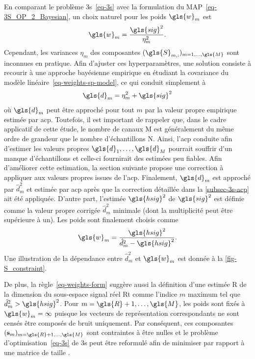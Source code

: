 En comparant le problème \gls{3s}~\eqref{eq-3s} avec la formulation du MAP~\eqref{eq-3S_OP_2_Bayesian}, un choix naturel pour les poids $\gls{w}_m$ est
\begin{equation}
    \gls{w}_m = \frac{\gls{sig}^2}{\eta_m^2}. 
\end{equation}
Cependant, les variances $\eta_m$ des composantes $(\gls{S}_{m, :})_{m=1,\dots,\gls{M}}$ sont inconnues en pratique. Afin d'ajuster ces hyperparamètres, une solution consiste à recourir à une approche bayésienne empirique en étudiant la covariance du modèle linéaire~\eqref{eq-weights-sp-model}, ce qui conduit simplement à
\begin{equation}
    \gls{d}_m = \eta_m^2 + \gls{sig}^2
\end{equation}
où $\gls{d}_m$ peut être approché pour tout $m$ par la valeur propre empirique estimée par \gls{acp}. Toutefois, il est important de rappeler que, dans le cadre applicatif de cette étude, le nombre de canaux \gls{M} est généralement du même ordre de grandeur que le nombre d'échantillons \gls{N}. Ainsi, l'\gls{acp} conduite afin d'estimer les valeurs propres $\gls{d}_1, \dots, \gls{d}_M$ pourrait souffrir d'un manque d'échantillons et celle-ci fournirait des estimées  peu fiables. Afin d'améliorer cette estimation, la section suivante propose une correction à appliquer aux valeurs propres issues de l'\gls{acp}. Finalement, $\gls{d}_m$ est approché par $\hat{d}_m^2$ et estimée par \gls{acp} après que la correction détaillée dans la \cref{subsec-3s-acp} ait été appliquée. D'autre part, l'estimée $\gls{hsig}^2$ de $\gls{sig}^2$ est définie comme la valeur propre corrigée $\hat{d}_m^2$ minimale (dont la multiplicité peut être supérieure à un). Les poids sont finalement choisis comme
\begin{equation}\label{eq-weights-form}
    \gls{w}_m = \frac{\gls{hsig}^2}{\hat{d}_m^2 - \gls{hsig}^2}.
\end{equation}
Une illustration de la dépendance entre $\hat{d}_m^2$ et $\gls{w}_m$ est donnée à la \cref{fig-S_constraint}. 

De plus, la règle~\eqref{eq-weights-form} suggère aussi la définition d'une estimée \gls{R} de la dimension du sous-espace signal réel \gls{Rt} comme l'indice $m$ maximum tel que $\hat{d}_{m}^2 > \gls{hsig}^2$. Pour $m=\gls{R}+1, \dots, \gls{M}$, les poids sont fixés  à $\gls{w}_m = \infty$ puisque les vecteurs de représentation correspondants ne sont censés être composés de bruit uniquement. Par conséquent, ces composantes $(\mathbf{s}_m)_{m=\gls{R}+1,\dots,\gls{M}}$ sont contraintes à être nulles et le problème d'optimisation~\eqref{eq-3s} de \gls{3s} peut être reformulé afin de minimiser par rapport à une matrice de taille .


